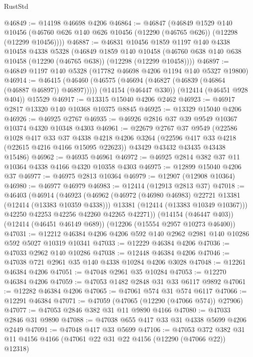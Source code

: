 \begin{lexlean}{RustStd}
\begin{coremodule}
@46849 := @14198 @46698 @4206
@46864 := @46847
    (@46849
      @1529
      @140
      @10456
      (@46760 @626 @140 @626 @10456 (@12290 (@46765 @626)) (@12298 (@12299 @10456))))
@46887 := @46831
    @10456
    @1859
    @1197
    @140
    @4338
    @10458
    @4338
    @5328
    (@46849
      @1859
      @140
      @10458
      (@46760 @638 @140 @638 @10458 (@12290 (@46765 @638)) (@12298 (@12299 @10458))))
@46897 := @46849 @1197 @140 @5328 (@17782 @46698 @4206 @1194 @140 @5327 @19800)
@46914 := @46415
    (@46460 (@46575 (@46694 (@46827 (@46839 (@46864 (@46887 @46897)) @46897)))))
    (@14154 (@46447 @330))
    (@12414 (@46451 @928 @404))
    @15529
@46917 := @13315 @15040 @4206 @2462
@46923 := @46917 @2817 @13320 @140 @10368 @10375 @8845
@46925 := @13329 @15040 @4206
@46926 := @46925 @2767
@46935 := @46926 @2816 @37 @39 @9549 @10367 @10374 @4320 @10348 @4303
@46961 := @22679
    @2767
    @37
    @9549
    (@22586
      @1028
      @417
      @33
      @37
      @4338
      @4218
      @4206
      @3264
      (@22596 @417 @33 @4218 (@22615 @4216 @4166 @15095 @22623))
      @43429
      @43432
      @43435
      @43438
      @15486)
@46962 := @46935 @46961
@46972 := @46925 @2814 @382 @37 @11 @10364 @4338 @4166 @4320 @10358 @4303
@46975 := @12899 @15040 @4206 @37
@46977 := @46975 @2813 @10364
@46979 := @12907 (@12908 @10364)
@46980 := @46977 @46979
@46983 := @12414 (@12913 @2813 @37)
@47018 := @46403
    (@46914
      (@46923
        (@46962
          (@46972 (@46980 @46983) @22721 @13381 (@12414 (@13383 @10359 @4338)))
          @13381
          (@12414 (@13383 @10349 @10367)))
        @42250
        @42253
        @42256
        @42260
        @42265
        @42271))
    (@14154 (@46447 @403))
    (@12414 (@46451 @46149 @689))
    (@12206 (@15554 @2957 @10273 @46400))
@47031 := @12212 @46384 @4206 @4206 @592 @140 @2962 @2981 @140 @10286 @592 @5027 @10319 @10341
@47033 := @12229 @46384 @4206
@47036 := @47033 @2962 @140 @10286
@47038 := @12448 @46384 @4206
@47046 := @47038 @721 @2961 @35 @140 @4338 @10284 @4206 @3028
@47048 := @12261 @46384 @4206
@47051 := @47048 @2961 @35 @10284
@47053 := @12270 @46384 @4206
@47059 := @47053 @1482 @2848 @31 @33 @6117 @9892
@47061 := @12282 @46384 @4206
@47065 := @47061 @574 @31 @574 @6117
@47066 := @12291 @46384
@47071 := @47059 (@47065 (@12290 (@47066 @574)) @27906)
@47077 := @47053 @2846 @382 @31 @11 @9890 @4166
@47080 := @47033 @2846 @31 @9890
@47088 := @47038 @655 @417 @33 @31 @4338 @5699 @4206 @2449
@47091 := @47048 @417 @33 @5699
@47106 := @47053
    @372
    @382
    @31
    @11
    @4156
    @4166
    (@47061 @22 @31 @22 @4156 (@12290 (@47066 @22)) @12318)

\end{coremodule}
\end{lexlean}
